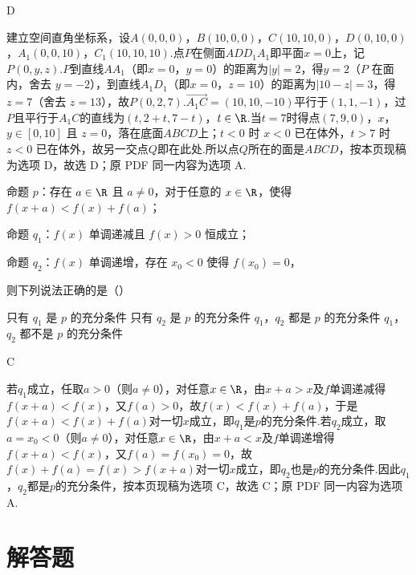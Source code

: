 \begin{answer}
D
\end{answer}

\begin{solution}
建立空间直角坐标系，设\(A(0,0,0)\)，\(B(10,0,0)\)，\(C(10,10,0)\)，\(D(0,10,0)\)，\(A_1(0,0,10)\)，\(C_1(10,10,10)\).点\(P\)在侧面\(ADD_1A_1\)即平面\(x=0\)上，记\(P(0,y,z)\).\(P\)到直线\(AA_1\)（即\(x=0\)，\(y=0\)）的距离为\(|y|=2\)，得\(y=2\)（\(P\) 在面内，舍去 \(y=-2\)），到直线\(A_1D_1\)（即\(x=0\)，\(z=10\)）的距离为\(|10-z|=3\)，得\(z=7\)（舍去 \(z=13\)），故\(P(0,2,7)\).\(\overrightarrow{A_1C}=(10,10,-10)\)平行于\((1,1,-1)\)，过\(P\)且平行于\(A_1C\)的直线为\((t,2+t,7-t)\)，\(t\in\R\).当\(t=7\)时得点\((7,9,0)\)，\(x\)，\(y\in[0,10]\) 且 \(z=0\)，落在底面\(ABCD\)上；\(t<0\) 时 \(x<0\) 已在体外，\(t>7\) 时 \(z<0\) 已在体外，故另一交点\(Q\)即在此处.所以点\(Q\)所在的面是\(ABCD\)，按本页现稿为选项 D，故选 D；原 PDF 同一内容为选项 A.
\end{solution}

\begin{problem}
命题 \(p\)：存在 \(a\in\R\) 且 \(a\neq0\)，对于任意的 \(x\in\R\)，使得 \(f(x+a)<f(x)+f(a)\)；

命题 \(q_1\)：\(f(x)\) 单调递减且 \(f(x)>0\) 恒成立；

命题 \(q_2\)：\(f(x)\) 单调递增，存在 \(x_0<0\) 使得 \(f(x_0)=0\)，

则下列说法正确的是（\quad）

\choices
    {只有 \(q_1\) 是 \(p\) 的充分条件}
    {只有 \(q_2\) 是 \(p\) 的充分条件}
    {\(q_1\)，\(q_2\) 都是 \(p\) 的充分条件}
    {\(q_1\)，\(q_2\) 都不是 \(p\) 的充分条件}
\end{problem}

\begin{answer}
C
\end{answer}

\begin{solution}
若\(q_1\)成立，任取\(a>0\)（则\(a\ne0\)），对任意\(x\in\R\)，由\(x+a>x\)及\(f\)单调递减得\(f(x+a)<f(x)\)，又\(f(a)>0\)，故\(f(x)<f(x)+f(a)\)，于是\(f(x+a)<f(x)+f(a)\)对一切\(x\)成立，即\(q_1\)是\(p\)的充分条件.若\(q_2\)成立，取\(a=x_0<0\)（则\(a\ne0\)），对任意\(x\in\R\)，由\(x+a<x\)及\(f\)单调递增得\(f(x+a)<f(x)\)，又\(f(a)=f(x_0)=0\)，故\(f(x)+f(a)=f(x)>f(x+a)\)对一切\(x\)成立，即\(q_2\)也是\(p\)的充分条件.因此\(q_1\)，\(q_2\)都是\(p\)的充分条件，按本页现稿为选项 C，故选 C；原 PDF 同一内容为选项 A.
\end{solution}
\section{解答题}

